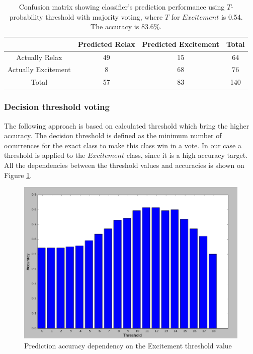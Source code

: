 \documentclass[12pt]{article}
\theoremstyle{definition}
\begin{document}
\begin{table}[H]
\begin{center}
  \begin{tabular}{ | c | c | c | c | }
    \hline
     & Predicted Relax & Predicted Excitement & Total \\ \hline
    Actually Relax & 49 & 15 & 64 \\ \hline
    Actually Excitement & 8 & 68 & 76 \\ \hline
    Total & 57 & 83 & 140 \\ 
    \hline
  \end{tabular}
\end{center}
\caption{Confusion matrix showing classifier's prediction performance using $T$-probability threshold with majority voting, where $T$ for $Excitement$ is 0.54. The accuracy is 83.6\%.} 
\end{table}

\subsubsection{Decision threshold voting}

The following approach is based on calculated threshold which bring the higher accuracy. The decision threshold is defined as the minimum number of occurrences for the exact class to make this class win in a vote. In our case a threshold is applied to the $Excitement$ class, since it is a high accuracy target. All the dependencies between the threshold values and accuracies is shown on Figure \ref{fig:fnCompModel}.

\begin{figure} [H]
\begin{center}
\includegraphics[width=1\textwidth]{threshold_accuracy_curve}
\caption{Prediction accuracy dependency on the Excitement threshold value}
\label{fig:fnCompModel}
\end{center}
\end{figure}
\end{document}
